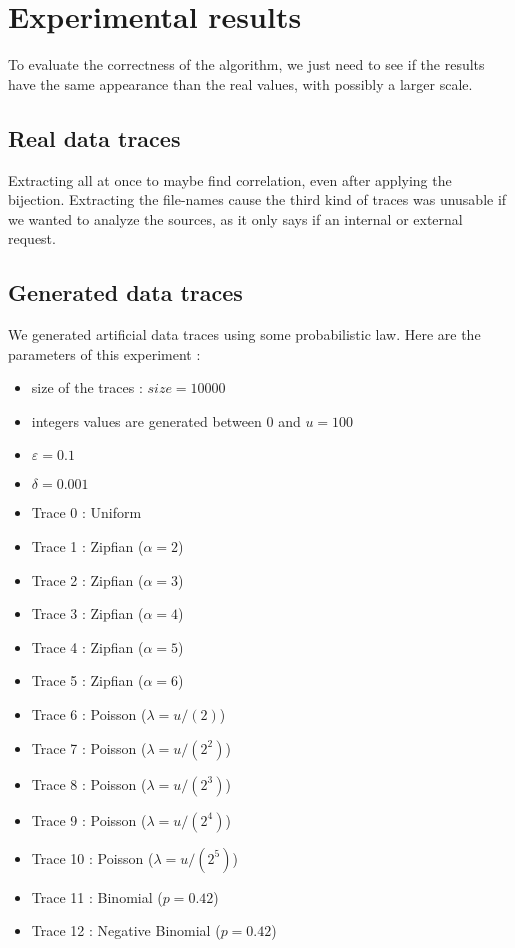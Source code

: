 \documentclass[a4paper]{article}%
\begin{document}
\section{Experimental results}
To evaluate the correctness of the algorithm, we just need to see if the results have the same appearance than the real values, with possibly a larger scale.

\subsection{Real data traces}
Extracting all at once to maybe find correlation, even after applying the bijection. Extracting the file-names cause the third kind of traces was unusable if we wanted to analyze the sources, as it only says if an internal or external request.

\subsection{Generated data traces}

We generated artificial data traces using some probabilistic law. Here are the parameters of this experiment :
\begin{itemize}
	\item size of the traces : $size = 10 000$
	\item integers values are generated between $0$ and $u = 100$
	\item $\varepsilon = 0.1$
	\item $\delta = 0.001$
\end{itemize}

\begin{itemize}
	\item Trace 0 : Uniform
	\item Trace 1 : Zipfian ($\alpha = 2$)
	\item Trace 2 : Zipfian ($\alpha = 3$)
	\item Trace 3 : Zipfian ($\alpha = 4$)
	\item Trace 4 : Zipfian ($\alpha = 5$)
	\item Trace 5 : Zipfian ($\alpha = 6$)
	\item Trace 6 : Poisson ($\lambda = u/(2)$)
	\item Trace 7 : Poisson ($\lambda = u/(2^2)$)
	\item Trace 8 : Poisson ($\lambda = u/(2^3)$)
	\item Trace 9 : Poisson ($\lambda = u/(2^4)$)
	\item Trace 10 : Poisson ($\lambda = u/(2^5)$)
	\item Trace 11 : Binomial ($p = 0.42$)
	\item Trace 12 : Negative Binomial ($p = 0.42$)
\end{itemize}
\end{document}
